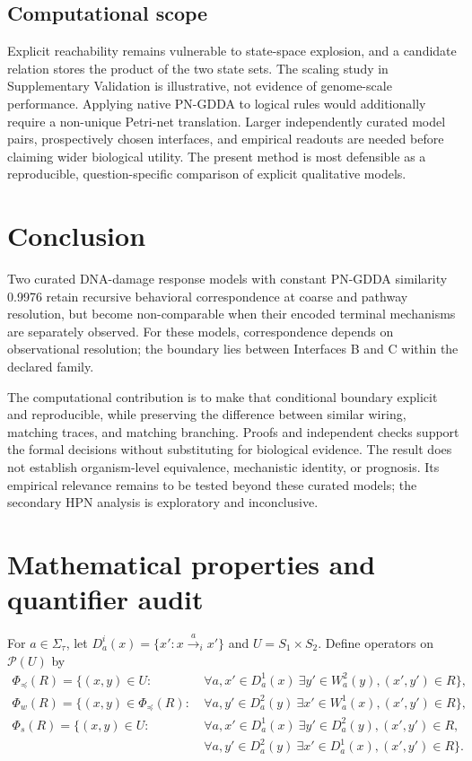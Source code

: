 \documentclass{ws-jbcb}
\numberwithin{equation}{section}
\newcommand{\TAU}{\tau}
\newcommand{\powerset}{\mathcal{P}}
\begin{document}
\subsection{Computational scope}
Explicit reachability remains vulnerable to state-space explosion, and a
candidate relation stores the product of the two state sets. The scaling study
in Supplementary Validation is illustrative, not evidence of genome-scale
performance. Applying native PN-GDDA to logical rules would additionally require
a non-unique Petri-net translation. Larger independently curated model pairs,
prospectively chosen interfaces, and empirical readouts are needed before
claiming wider biological utility. The present method is most defensible as a
reproducible, question-specific comparison of explicit qualitative models.

\section{Conclusion}\label{sec:conclusion}

Two curated DNA-damage response models with constant PN-GDDA similarity 0.9976
retain recursive behavioral correspondence at coarse and pathway resolution,
but become non-comparable when their encoded terminal mechanisms are separately
observed. For these models, correspondence depends on observational resolution;
the boundary lies between Interfaces B and C within the declared family.

The computational contribution is to make that conditional boundary explicit
and reproducible, while preserving the difference between similar wiring,
matching traces, and matching branching. Proofs and independent checks support
the formal decisions without substituting for biological evidence. The result
does not establish organism-level equivalence, mechanistic identity, or
prognosis. Its empirical relevance remains to be tested beyond these curated
models; the secondary HPN analysis is exploratory and inconclusive.

\appendix
\section{Mathematical properties and quantifier audit}\label{app:formal}
\label{sec:fixed-point}

For $a\in\Sigma_{\TAU}$, let $D_a^i(x)=\{x':x\xrightarrow{a}_i x'\}$ and
$U=S_1\times S_2$. Define operators on $\powerset(U)$ by
\begin{align}
\Phi_{\preceq}(R)=\{(x,y)\in U:
 &\ \forall a,x'\in D_a^1(x)\ \exists y'\in W_a^2(y),
 (x',y')\in R\},\label{eq:sim-operator}\\
\Phi_w(R)=\{(x,y)\in\Phi_{\preceq}(R):
 &\ \forall a,y'\in D_a^2(y)\ \exists x'\in W_a^1(x),
 (x',y')\in R\},\label{eq:weak-bisim-operator}\\
\Phi_s(R)=\{(x,y)\in U:
 &\ \forall a,x'\in D_a^1(x)\ \exists y'\in D_a^2(y),
 (x',y')\in R,\nonumber\\
 &\ \forall a,y'\in D_a^2(y)\ \exists x'\in D_a^1(x),
 (x',y')\in R\}.\label{eq:strong-bisim-operator}
\end{align}
\end{document}

